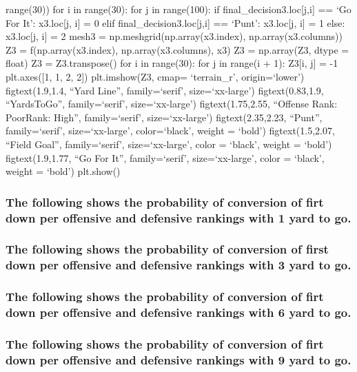 \documentclass[letterpaper,10pt,english]{/anaconda/lib/python2.7/site-packages/sphinx/texinputs/sphinxhowto}
\begin{document}
{range(30)) for i in range(30): for j in range(100): if
final\_decision3.loc{[}j,i{]} == `Go For It': x3.loc{[}j, i{]} = 0 elif
final\_decision3.loc{[}j,i{]} == `Punt': x3.loc{[}j, i{]} = 1 else:
x3.loc{[}j, i{]} = 2 mesh3 = np.meshgrid(np.array(x3.index),
np.array(x3.columns)) Z3 = f(np.array(x3.index), np.array(x3.columns),
x3) Z3 = np.array(Z3, dtype = float) Z3 = Z3.transpose() for i in
range(30): for j in range(i + 1): Z3{[}i, j{]} = -1 plt.axes({[}1, 1, 2,
2{]}) plt.imshow(Z3, cmap= `terrain\_r', origin=`lower')
figtext(1.9,1.4, ``Yard Line'', family=`serif', size=`xx-large')
figtext(0.83,1.9, ``Yards\n  To\n  Go'', family=`serif',
size=`xx-large') figtext(1.75,2.55, ``Offense Rank: Poor\nDefense Rank:
High'', family=`serif', size=`xx-large') figtext(2.35,2.23, ``Punt'',
family=`serif', size=`xx-large', color=`black', weight = `bold')
figtext(1.5,2.07, ``Field Goal'', family=`serif', size=`xx-large', color
= `black', weight = `bold') figtext(1.9,1.77, ``Go For It'',
family=`serif', size=`xx-large', color = `black', weight = `bold')
plt.show()}\subsubsection{The following shows the probability of conversion of firt down per
offensive and defensive rankings with 1 yard to go.}\subsubsection{}\subsubsection{The following shows the probability of conversion of first down per
offensive and defensive rankings with 3 yard to go.}\subsubsection{}\subsubsection{The following shows the probability of conversion of firt down per
offensive and defensive rankings with 6 yard to go.}\subsubsection{}\subsubsection{The following shows the probability of conversion of firt down per
offensive and defensive rankings with 9 yard to go.}\subsubsection{}


        

        \renewcommand{\indexname}{Index}
        \printindex

    
\end{document}
